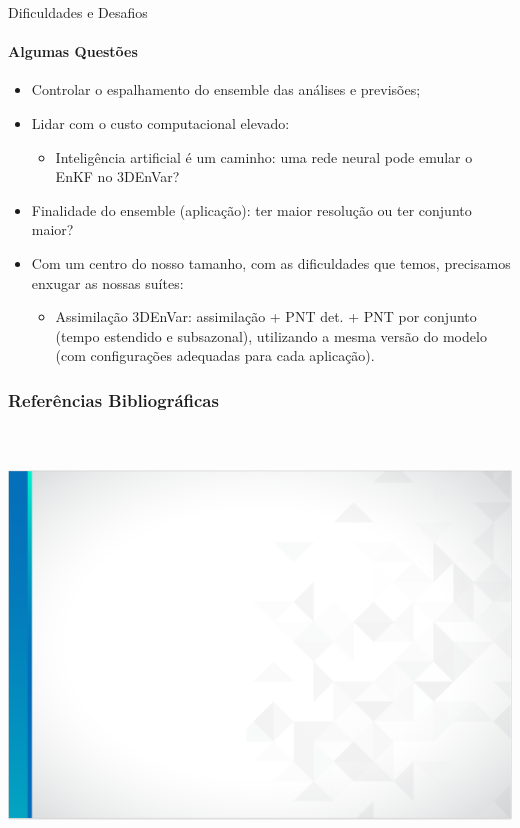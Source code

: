 \documentclass[10pt,aspectratio=169]{beamer}
\begin{document}
\begin{frame}{Dificuldades e Desafios}
\framesubtitle{Algumas Questões \faQuestionCircle}
	\begin{itemize}
		\item Controlar o espalhamento do ensemble das análises e previsões;
		\pause
		\item Lidar com o custo computacional elevado:
		\begin{itemize}
			\item Inteligência artificial é um caminho: uma rede neural pode emular o EnKF no 3DEnVar?
		\end{itemize}
		\pause
		\item Finalidade do ensemble (aplicação): ter maior resolução ou ter conjunto maior?
		\item Com um centro do nosso tamanho, com as dificuldades que temos, precisamos enxugar as nossas suítes:
		\begin{itemize}
			\item Assimilação 3DEnVar: assimilação + PNT det. + PNT por conjunto (tempo estendido e subsazonal), utilizando a mesma versão do modelo (com configurações adequadas para cada aplicação).
		\end{itemize}
	\end{itemize}
\end{frame}

\begin{frame}
\frametitle{Referências Bibliográficas}
\framesubtitle{\faBookOpen~\faNewspaper[regular]~}
\vspace{-1em}

\end{frame}

\usebackgroundtemplate%
{%
	\includegraphics[width=\paperwidth,height=\paperheight]{fundo_slide_inpe_sem_logo.png}%
}
\end{document}

